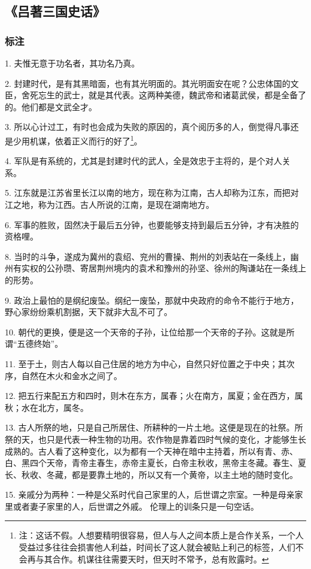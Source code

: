 \subsection{《吕著三国史话》}

\subsubsection{标注}
1. 夫惟无意于功名者，其功名乃真。

2. 封建时代，是有其黑暗面，也有其光明面的。其光明面安在呢？公忠体国的文臣，舍死忘生的武士，就是其代表。这两种美德，魏武帝和诸葛武侯，都是全备了的。他们都是文武全才。

3. 所以心计过工，有时也会成为失败的原因的，真个阅历多的人，倒觉得凡事还是少用机谋，依着正义而行的好了\footnote{注：这话不假。人想要精明很容易，但人与人之间本质上是合作关系，一个人受益过多往往会损害他人利益，时间长了这人就会被贴上利己的标签，人们不会再与其合作。机谋往往需要天时，但天时不常予，总有败露时。}。

4. 军队是有系统的，尤其是封建时代的武人，全是效忠于主将的，是个对人关系。

5. 江东就是江苏省里长江以南的地方，现在称为江南，古人却称为江东，而把对江之地，称为江西。古人所说的江南，是现在湖南地方。

6. 军事的胜败，固然决于最后五分钟，也要能够支持到最后五分钟，才有决胜的资格哩。

8. 当时的斗争，遂成为冀州的袁绍、兖州的曹操、荆州的刘表站在一条线上，幽州有实权的公孙瓒、寄居荆州境内的袁术和豫州的孙坚、徐州的陶谦站在一条线上的形势。

9. 政治上最怕的是纲纪废坠。纲纪一废坠，那就中央政府的命令不能行于地方，野心家纷纷乘机割据，天下就非大乱不可了。

10. 朝代的更换，便是这一个天帝的子孙，让位给那一个天帝的子孙。这就是所谓“五德终始”。

11. 至于土，则古人每以自己住居的地方为中心，自然只好位置之于中央；其次序，自然在木火和金水之间了。

12. 把五行来配五方和四时，则木在东方，属春；火在南方，属夏；金在西方，属秋；水在北方，属冬。

13. 古人所祭的地，只是自己所居住、所耕种的一片土地。这便是现在的社祭。所祭的天，也只是代表一种生物的功用。农作物是靠着四时气候的变化，才能够生长成熟的。古人看了这种变化，以为都有一个天神在暗中主持着，所以有青、赤、白、黑四个天帝，青帝主春生，赤帝主夏长，白帝主秋收，黑帝主冬藏。春生、夏长、秋收、冬藏，都是要靠土地的，所以又有一个黄帝，以主土地的随时变化。

15. 亲戚分为两种：一种是父系时代自己家里的人，后世谓之宗室。一种是母亲家里或者妻子家里的人，后世谓之外戚。 伦理上的训条只是一句空话。

